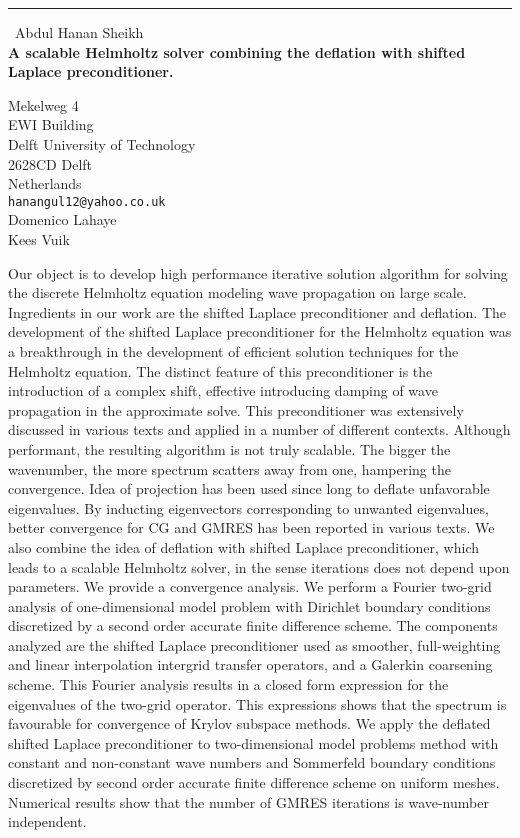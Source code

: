 \documentclass{report}
\begin{document}
\begin{center}
\rule{6in}{1pt} \
{\large Abdul Hanan Sheikh \\
{\bf A scalable Helmholtz solver combining the deflation with shifted Laplace preconditioner.}}

Mekelweg 4 \\ EWI Building \\ Delft University of Technology \\ 2628CD Delft \\ Netherlands
\\
{\tt hanangul12@yahoo.co.uk}\\
Domenico Lahaye\\
Kees Vuik\end{center}

Our object is to develop high performance iterative solution algorithm
for solving the discrete Helmholtz equation modeling wave propagation on
large scale. Ingredients in our work are the shifted Laplace
preconditioner and deflation. The development of the shifted Laplace
preconditioner for the Helmholtz equation was a breakthrough in the
development of efficient solution techniques for the Helmholtz equation.
The distinct feature of this preconditioner is the introduction of a
complex shift, effective introducing damping of wave propagation in the
approximate solve. This preconditioner was extensively discussed in
various texts and applied in a number of different contexts. Although
performant, the resulting algorithm is not truly scalable. The bigger the
wavenumber, the more spectrum scatters away from one, hampering the
convergence. Idea of projection has been used since long to deflate
unfavorable eigenvalues. By inducting eigenvectors corresponding to
unwanted eigenvalues, better convergence for CG and GMRES has been
reported in various texts. We also combine the idea of deflation with
shifted Laplace preconditioner, which leads to a scalable Helmholtz
solver, in the sense iterations does not depend upon parameters.
We provide a convergence analysis. We perform a Fourier two-grid analysis
of one-dimensional model problem with Dirichlet boundary conditions
discretized by a second order accurate finite difference scheme. The
components analyzed are the shifted Laplace preconditioner used as
smoother, full-weighting and linear interpolation intergrid transfer
operators, and a Galerkin coarsening scheme. This Fourier analysis
results in a closed form expression for the eigenvalues of the two-grid
operator. This expressions shows that the spectrum is favourable for
convergence of Krylov subspace methods.
We apply the deflated shifted Laplace preconditioner to two-dimensional
model problems method with constant and non-constant wave numbers and
Sommerfeld boundary conditions discretized by second order accurate
finite difference scheme on uniform meshes. Numerical results show that
the number of GMRES iterations is wave-number independent.
\end{document}
